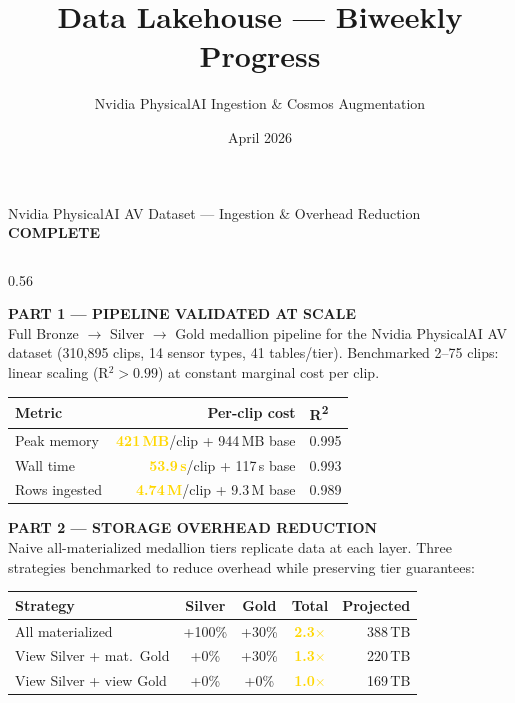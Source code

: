 \documentclass[aspectratio=169,11pt]{beamer}
\title{Data Lakehouse --- Biweekly Progress}
\subtitle{Nvidia PhysicalAI Ingestion \& Cosmos Augmentation}
\date{April 2026}
\author{}
\institute{NetAI Digital Twin Project}
\begin{document}
\maketitle

\begin{frame}{Nvidia PhysicalAI AV Dataset --- Ingestion \& Overhead Reduction
  \hfill\colorbox{good!20}{\scriptsize\textcolor{good}{\textbf{COMPLETE}}}}

\begin{columns}[T]

\begin{column}{0.56\textwidth}

{\footnotesize\textbf{\textcolor{accent}{PART 1 --- PIPELINE VALIDATED AT SCALE}}}\\[3pt]
{\scriptsize
Full Bronze $\to$ Silver $\to$ Gold medallion pipeline for
the Nvidia PhysicalAI AV dataset (310,895 clips, 14 sensor types, 41 tables/tier).
Benchmarked 2--75 clips: linear scaling (R$^2 > 0.99$) at constant marginal cost per clip.
}

\vspace{3pt}
{\scriptsize
\begin{tabular}{@{}lrl@{}}
\toprule
Metric & Per-clip cost & R\textsuperscript{2} \\
\midrule
Peak memory & \textbf{\textcolor{gold}{421\,MB}}/clip + 944\,MB base & 0.995 \\
Wall time & \textbf{\textcolor{gold}{53.9\,s}}/clip + 117\,s base & 0.993 \\
Rows ingested & \textbf{\textcolor{gold}{4.74\,M}}/clip + 9.3\,M base & 0.989 \\
\bottomrule
\end{tabular}
}

\vspace{6pt}
{\footnotesize\textbf{\textcolor{accent}{PART 2 --- STORAGE OVERHEAD REDUCTION}}}\\[2pt]
{\tiny\color{muted} Naive all-materialized medallion tiers replicate data at each layer.
Three strategies benchmarked to reduce overhead while preserving tier guarantees:}

\vspace{3pt}
{\scriptsize
\begin{tabular}{@{}p{2.7cm}cccr@{}}
\toprule
Strategy & Silver & Gold & Total & Projected \\
\midrule
\textcolor{bad}{All materialized} & +100\% & +30\% & \textbf{\textcolor{gold}{2.3$\times$}} & 388\,TB \\
\textcolor{mid}{View Silver + mat.\ Gold} & +0\% & +30\% & \textbf{\textcolor{gold}{1.3$\times$}} & 220\,TB \\
\rowcolor{good!8}
\textcolor{good}{View Silver + view Gold} & +0\% & +0\% & \textbf{\textcolor{gold}{1.0$\times$}} & 169\,TB \\
\bottomrule
\end{tabular}
}


\end{column}
\end{columns}
\end{frame}
\end{document}
